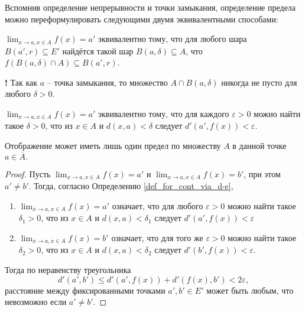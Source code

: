 Вспомнив определение непрерывности и точки замыкания, определение предела можно переформулировать следующими двумя эквивалентными способами:

\begin{definition}
    $\lim_{x \to a, x \in A}f(x) = a'$ эквивалентно тому, что для любого шара $B(a',r) \subseteq E'$ найдётся такой шар $B(a,\delta) \subseteq A$, что $f(B(a,\delta)\cap A) \subseteq B(a',r)$.
\end{definition}
\begin{mydanger}{\bf{!}}
    Так как $a$ -- точка замыкания, то множество $A \cap B(a,\delta)$ никогда не пусто для любого $\delta >0$.
\end{mydanger}




































\begin{definition}\label{def_for_cont_via_d-e}
    $\lim_{x \to a, x \in A}f(x) = a'$ эквивалентно тому, что для каждого $\varepsilon>0$ можно найти такое $\delta >0$, что из $x \in A$ и $d(x,a)<\delta$ следует $d'(a',f(x))<\varepsilon.$
\end{definition}

\begin{proposition}
    Отображение может иметь лишь один предел по множеству $A$ в данной точке $a \in \overline{A}.$
\end{proposition}
\begin{proof}
    Пусть  $\lim_{x \to a, x \in A}f(x) = a'$ и  $\lim_{x \to a, x \in A}f(x) = b'$, при этом $a' \ne b'$. Тогда, согласно Определению \ref{def_for_cont_via_d-e}, 
 \begin{enumerate}
     \item  $\lim_{x \to a, x \in A}f(x) = a'$ означает, что для любого $\varepsilon >0$ можно найти такое $\delta_1 >0$, что из $x \in A$ и $d(x,a)<\delta_1$ следует $d'(a',f(x))<\varepsilon$
     \item $\lim_{x \to a, x \in A}f(x) = b'$ означает, что для того же $\varepsilon >0$ можно найти такое $\delta_2 >0$, что из $x \in A$ и $d(x,a)<\delta_2$ следует $d'(b',f(x))<\varepsilon$.
 \end{enumerate}
Тогда по неравенству треугольника
\[
 d'(a',b') \le d'(a', f(x)) + d'(f(x), b') < 2\varepsilon,
\]
\ie расстояние между фиксированными точками $a',b' \in E'$ может быть любым, что невозможно если $a' \ne b'.$
\end{proof}

